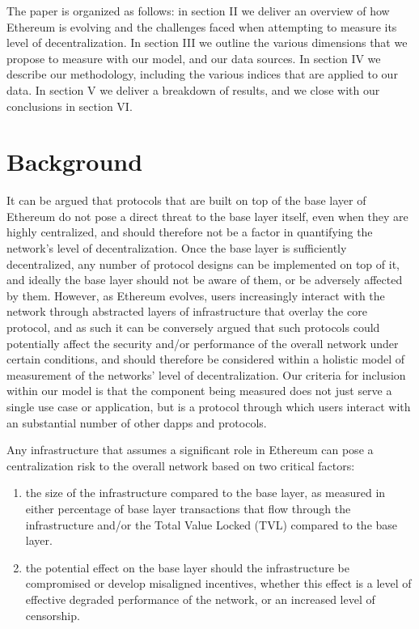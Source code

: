 \documentclass[conference]{IEEEtran}
\begin{document}
The paper is organized as follows: in section II we deliver an overview of how Ethereum is evolving and the challenges faced when attempting to measure its level of decentralization.  In section III we outline the various dimensions that we propose to measure with our model, and our data sources.  In section IV we describe our methodology, including the various indices that are applied to our data.  In section V we deliver a breakdown of results, and we close with our conclusions in section VI.

\section{Background}

It can be argued that protocols that are built on top of the base layer of Ethereum do not pose a direct threat to the base layer itself, even when they are highly centralized, and should therefore not be a factor in quantifying the network's level of decentralization.  Once the base layer is sufficiently decentralized, any number of protocol designs can be implemented on top of it, and ideally the base layer should not be aware of them, or be adversely affected by them.  However, as Ethereum evolves, users increasingly interact with the network through abstracted layers of infrastructure that overlay the core protocol, and as such it can be conversely argued that such protocols could potentially affect the security and/or performance of the overall network under certain conditions, and should therefore be considered within a holistic model of measurement of the networks' level of decentralization. Our criteria for inclusion within our model is that the component being measured does not just serve a single use case or application, but is a protocol through which users interact with an substantial number of other dapps and protocols.

Any infrastructure that assumes a significant role in Ethereum can pose a centralization risk to the overall network based on two critical factors:
\begin{enumerate}[label=\alph*.]
\item the size of the infrastructure compared to the base layer, as measured in either percentage of base layer transactions that flow through the infrastructure and/or the Total Value Locked (TVL) compared to the base layer.
\item the potential effect on the base layer should the infrastructure be compromised or develop misaligned incentives, whether this effect is a level of effective degraded performance of the network, or an increased level of censorship.
\end{enumerate}
\end{document}
